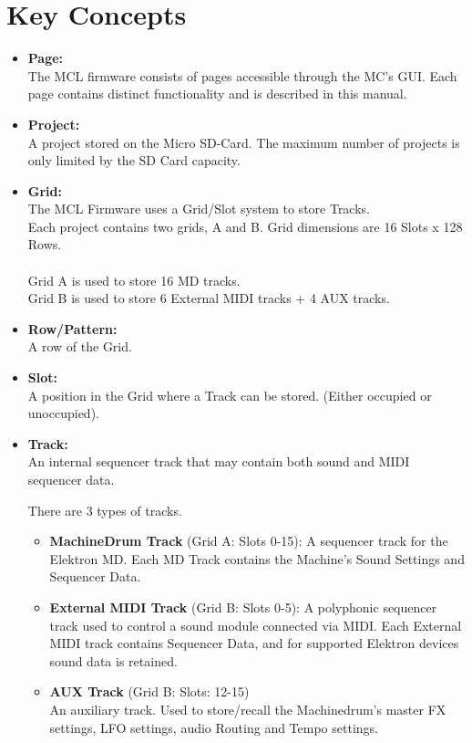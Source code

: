 \chapter{Key Concepts}

\begin{itemize}
\item \textbf{Page:}
\\
The MCL firmware consists of pages accessible through the MC's GUI. Each page contains distinct functionality and is described in this manual.
\item \textbf{Project:}
\\
A project stored on the Micro SD-Card.
The maximum number of projects is only limited by the SD Card capacity.

\item \textbf{Grid:}
\\
The MCL Firmware uses a Grid/Slot system to store Tracks.\\
Each project contains two grids, A and B. Grid dimensions are 16 Slots x 128 Rows.\\
\\
Grid A is used to store 16 MD tracks.\\Grid B is used to store 6 External MIDI tracks + 4 AUX tracks.

\item \textbf{Row/Pattern:}
\\
A row of the Grid.

\item \textbf{Slot:}
\\
A position in the Grid where a Track can be stored. (Either occupied or unoccupied).

\item \textbf{Track:}
\\
An internal sequencer track that may contain both sound and MIDI sequencer data.

There are 3 types of tracks.
\begin{itemize}

\item \textbf{MachineDrum Track} (Grid A: Slots 0-15):
A sequencer track for the Elektron MD. Each MD Track contains the Machine's Sound Settings and Sequencer Data.

\item \textbf{External MIDI Track} (Grid B: Slots 0-5):
A polyphonic sequencer track used to control a sound module connected via MIDI. Each External MIDI track contains Sequencer Data, and for supported Elektron devices sound data is retained. 

\item \textbf{AUX Track} (Grid B: Slots: 12-15)\\
An auxiliary track. Used to store/recall the Machinedrum's master FX settings, LFO settings, audio Routing and Tempo settings.
\end{itemize}

\end{itemize}

